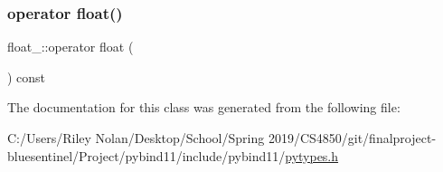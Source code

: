 \subsubsection{\texorpdfstring{operator float()}{operator float()}}
{\footnotesize\ttfamily float\+\_\+\+::operator float (\begin{DoxyParamCaption}{ }\end{DoxyParamCaption}) const\hspace{0.3cm}{\ttfamily [inline]}}



The documentation for this class was generated from the following file\+:\begin{DoxyCompactItemize}
\item 
C\+:/\+Users/\+Riley Nolan/\+Desktop/\+School/\+Spring 2019/\+C\+S4850/git/finalproject-\/bluesentinel/\+Project/pybind11/include/pybind11/\mbox{\hyperlink{pytypes_8h}{pytypes.\+h}}\end{DoxyCompactItemize}
